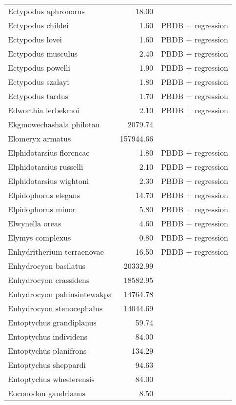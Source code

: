 \begin{table}[ht]
\begin{tabular}{lrl}
  Ectypodus aphronorus & 18.00 & \cite{Wilson2012} \\ 
  Ectypodus childei & 1.60 & PBDB + regression \\ 
  Ectypodus lovei & 1.60 & PBDB + regression \\ 
  Ectypodus musculus & 2.40 & PBDB + regression \\ 
  Ectypodus powelli & 1.90 & PBDB + regression \\ 
  Ectypodus szalayi & 1.80 & PBDB + regression \\ 
  Ectypodus tardus & 1.70 & PBDB + regression \\ 
  Edworthia lerbekmoi & 2.10 & PBDB + regression \\ 
  Ekgmowechashala philotau & 2079.74 & \cite{Tomiya2013} \\ 
  Elomeryx armatus & 157944.66 & \cite{Tomiya2013} \\ 
  Elphidotarsius florencae & 1.80 & PBDB + regression \\ 
  Elphidotarsius russelli & 2.10 & PBDB + regression \\ 
  Elphidotarsius wightoni & 2.30 & PBDB + regression \\ 
  Elpidophorus elegans & 14.70 & PBDB + regression \\ 
  Elpidophorus minor & 5.80 & PBDB + regression \\ 
  Elwynella oreas & 4.60 & PBDB + regression \\ 
  Elymys complexus & 0.80 & PBDB + regression \\ 
  Enhydritherium terraenovae & 16.50 & PBDB + regression \\ 
  Enhydrocyon basilatus & 20332.99 & \cite{Tomiya2013} \\ 
  Enhydrocyon crassidens & 18582.95 & \cite{Tomiya2013} \\ 
  Enhydrocyon pahinsintewakpa & 14764.78 & \cite{Tomiya2013} \\ 
  Enhydrocyon stenocephalus & 14044.69 & \cite{Tomiya2013} \\ 
  Entoptychus grandiplanus & 59.74 & \cite{Tomiya2013} \\ 
  Entoptychus individens & 84.00 & \cite{McKenna2011} \\ 
  Entoptychus planifrons & 134.29 & \cite{Tomiya2013} \\ 
  Entoptychus sheppardi & 94.63 & \cite{Tomiya2013} \\ 
  Entoptychus wheelerensis & 84.00 & \cite{McKenna2011} \\ 
  Eoconodon gaudrianus & 8.50 & \cite{Zonneveld2003} \\ 

\end{tabular}
\end{table}
